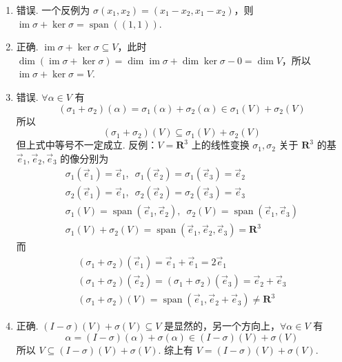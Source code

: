 \documentclass[UTF8,12pt,a4paper,fontset=fandol]{ctexart}
\begin{document}
\begin{solve}
\begin{enumerate}
                \item 错误. 一个反例为 $ \sigma(x_1, x_2) = (x_1 - x_2, x_1 - x_2) $，则 $ \operatorname{im} \sigma + \ker \sigma = \operatorname{span}((1, 1)) $.

                \item 正确. $ \operatorname{im} \sigma + \ker \sigma \subseteq V $，此时 $ \dim(\operatorname{im} \sigma + \ker \sigma) = \dim \operatorname{im} \sigma + \dim \ker \sigma - 0 = \dim V $，所以 $ \operatorname{im} \sigma + \ker \sigma = V $.

                \item \label{item:6:B:2:3}
                      错误. $ \forall \alpha \in V $ 有
                      \[ (\sigma_1 + \sigma_2)(\alpha) = \sigma_1(\alpha) + \sigma_2(\alpha) \in \sigma_1(V) + \sigma_2(V) \]
                      所以
                      \[ (\sigma_1 + \sigma_2)(V) \subseteq \sigma_1(V) + \sigma_2(V) \]
                      但上式中等号不一定成立. 反例：$ V = \mathbf{R}^3 $ 上的线性变换 $ \sigma_1, \sigma_2 $ 关于 $ \mathbf{R}^3 $ 的基 $ \vec{e}_1, \vec{e}_2, \vec{e}_3 $ 的像分别为
                      \begin{gather*}
                          \sigma_1(\vec{e}_1) = \vec{e}_1,\enspace \sigma_1(\vec{e}_2) = \sigma_1(\vec{e}_3) = \vec{e}_2 \\
                          \sigma_2(\vec{e}_1) = \vec{e}_1,\enspace \sigma_2(\vec{e}_2) = \sigma_2(\vec{e}_3) = \vec{e}_3 \\
                          \sigma_1(V) = \operatorname{span}(\vec{e}_1, \vec{e}_2),\enspace \sigma_2(V) = \operatorname{span}(\vec{e}_1, \vec{e}_3) \\
                          \sigma_1(V) + \sigma_2(V) = \operatorname{span}(\vec{e}_1, \vec{e}_2, \vec{e}_3) = \mathbf{R}^3
                      \end{gather*}
                      而
                      \begin{gather*}
                          (\sigma_1 + \sigma_2)(\vec{e}_1) = \vec{e}_1 + \vec{e}_1 = 2 \vec{e}_1 \\
                          (\sigma_1 + \sigma_2)(\vec{e}_2) = (\sigma_1 + \sigma_2)(\vec{e}_3) = \vec{e}_2 + \vec{e}_3 \\
                          (\sigma_1 + \sigma_2)(V) = \operatorname{span}(\vec{e}_1, \vec{e}_2 + \vec{e}_3) \neq \mathbf{R}^3
                      \end{gather*}

                \item 正确. $(I - \sigma)(V) + \sigma(V) \subseteq V$ 是显然的，另一个方向上，$ \forall \alpha \in V $ 有
                      \[ \alpha = (I - \sigma)(\alpha) + \sigma(\alpha) \in (I - \sigma)(V) + \sigma(V) \]
                      所以 $ V \subseteq (I - \sigma)(V) + \sigma(V) $. 综上有 $ V = (I - \sigma)(V) + \sigma(V) $.
            \end{enumerate}
\end{solve}
\end{document}

